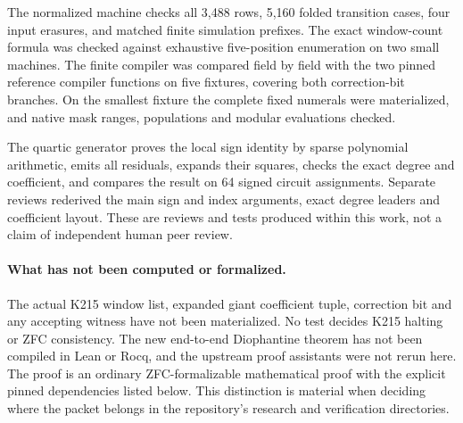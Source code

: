 \documentclass[11pt,a4paper]{article}
\theoremstyle{definition}\newtheorem{definition}[theorem]{Definition}
\begin{document}
The normalized machine checks all 3,488 rows, 5,160 folded transition
cases, four input erasures, and matched finite simulation prefixes.
The exact window-count formula was checked against exhaustive
five-position enumeration on two small machines. The finite compiler
was compared field by field with the two pinned reference compiler
functions on five fixtures, covering both correction-bit branches.
On the smallest fixture the complete fixed numerals were materialized,
and native mask ranges, populations and modular evaluations checked.

The quartic generator proves the local sign identity by sparse
polynomial arithmetic, emits all residuals, expands their squares,
checks the exact degree and coefficient, and compares the result on
64 signed circuit assignments. Separate reviews rederived the main
sign and index arguments, exact degree leaders and coefficient layout.
These are reviews and tests produced within this work, not a claim
of independent human peer review.

\paragraph{What has not been computed or formalized.}
The actual K215 window list, expanded giant coefficient tuple,
correction bit and any accepting witness have not been materialized.
No test decides K215 halting or ZFC consistency. The new end-to-end
Diophantine theorem has not been compiled in Lean or Rocq, and the
upstream proof assistants were not rerun here. The proof is an ordinary
ZFC-formalizable mathematical proof with the explicit pinned
dependencies listed below. This distinction is material when deciding
where the packet belongs in the repository's research and verification
directories.

\appendix
\end{document}
